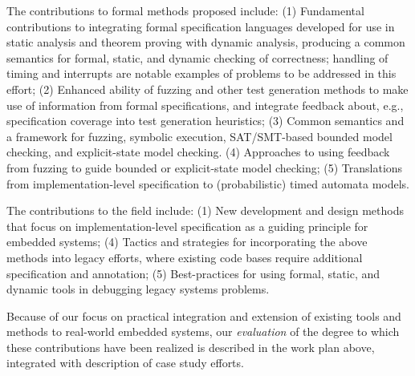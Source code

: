 The contributions to formal methods proposed include: (1)
Fundamental contributions to integrating formal specification
languages developed for use in static analysis and theorem proving
with dynamic analysis, producing a common semantics for formal,
static, and dynamic checking of correctness; handling of timing and
interrupts are notable examples of problems to be addressed in this effort;
(2) Enhanced ability of fuzzing and other test generation methods to
make use of information from formal specifications, and integrate
feedback about, e.g., specification coverage into test generation
heuristics;
(3) Common semantics and a framework for fuzzing, symbolic execution, SAT/SMT-based
bounded model checking, and explicit-state model checking.
(4) Approaches to using feedback from fuzzing to guide bounded or explicit-state model
checking;
(5) Translations from implementation-level specification to
(probabilistic) timed automata models.

The contributions to the field include:
(1)  New development and design methods that focus on
implementation-level specification as a guiding
principle for embedded systems; (4) Tactics and strategies for incorporating the above methods into
legacy efforts, where existing code bases require additional
specification and annotation; (5) Best-practices for using formal, static, and dynamic tools in
debugging legacy systems problems.


Because of our focus on practical integration and extension of
existing tools and methods to real-world embedded systems,
our \emph{evaluation} of the degree to which these contributions have
been realized is described in the work plan above, integrated with
description of case study efforts.